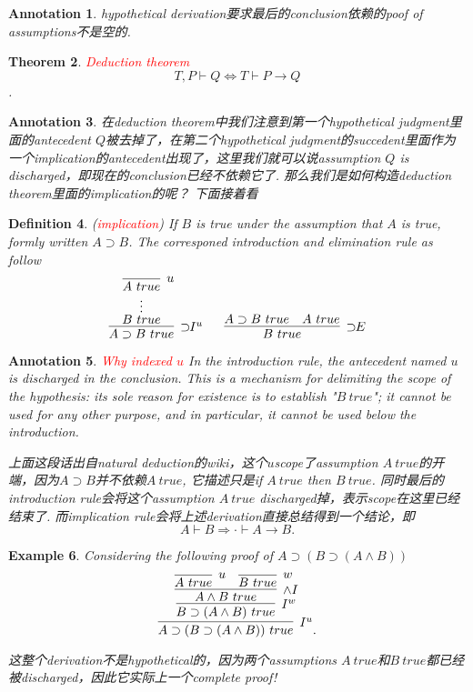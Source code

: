 \documentclass{article}
\theoremstyle{plain}
\newtheorem{theorem}{Theorem}
\newtheorem{example}[theorem]{Example}
\newtheorem{definition}[theorem]{Definition}
\newtheorem{annotation}[theorem]{Annotation}
\theoremstyle{nonumberplain}
\newcommand{\redt}[1]{\textcolor{red}{#1}}
\begin{document}
\begin{annotation}
\rm hypothetical derivation要求最后的conclusion依赖的poof of assumptions不是空的. 
\end{annotation}

\begin{theorem}
\rm \redt{Deduction theorem} \[T, P \vdash Q \iff T \vdash P \to Q\].
\end{theorem}

\begin{annotation}
\rm 在deduction theorem中我们注意到第一个hypothetical judgment里面的antecedent $Q$被去掉了，在第二个hypothetical judgment的succedent里面作为一个implication的antecedent出现了，这里我们就可以说assumption $Q$ is discharged，即现在的conclusion已经不依赖它了. 那么我们是如何构造deduction theorem里面的implication的呢？ 下面接着看
\end{annotation}

\begin{definition}
\rm (\redt{implication}) If $B$ is true under the assumption that $A$ is true, formly written $A \supset B$. The corresponed introduction and elimination rule as follow \[\infer[\supset\!\!I^u]{A \supset B~true}{\deduce[\vdots]{B~true}{\infer[u]{A~true}{}}}~~~~~ \infer[\supset\!\!E]{B~true}{A\supset B~true & A~true}\]
\end{definition}

\begin{annotation}
\rm \redt{Why indexed $u$} In the introduction rule, the antecedent named $u$ is discharged in the conclusion. This is a mechanism for delimiting the scope of the hypothesis: its sole reason for existence is to establish "$B~true$"; it cannot be used for any other purpose, and in particular, it cannot be used below the introduction.

上面这段话出自natural deduction的wiki，这个$u$scope了assumption $A~true$的开端，因为$A\supset B$并不依赖$A~true$, 它描述只是if $A~true$ then $B~true$. 
同时最后的introduction rule会将这个assumption $A~true$ discharged掉，表示scope在这里已经结束了. 而implication rule会将上述derivation直接总结得到一个结论，即
$$
A \vdash B \Rightarrow \cdot\vdash A \to B. 
$$
\end{annotation}

\begin{example}
\rm Considering the following proof of $A \supset (B \supset (A \wedge B))$
$$
\infer[I^u]{A \supset (B \supset (A \wedge B))~true}{\infer[I^w]{B \supset (A \wedge B)~true}{\infer[\wedge I]{A \wedge B~true}{\infer[u]{A~true}{} & \infer[w]{B~true}{}}}}.
$$

这整个derivation不是hypothetical的，因为两个assumptions $A~true$和$B~true$都已经被discharged，因此它实际上一个complete proof! 
\end{example}
\end{document}
